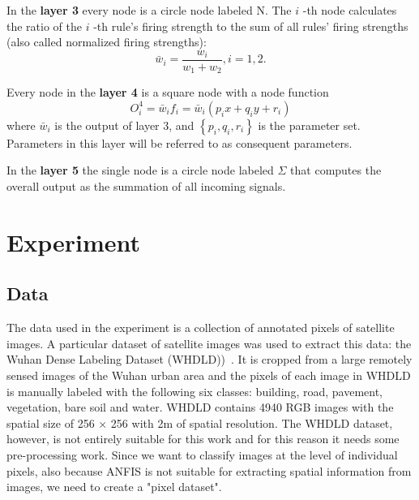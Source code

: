 \documentclass[10pt,twocolumn,letterpaper]{article}
\begin{document}
In the \textbf{layer 3} every node is a circle node labeled $\mathrm{N}$. The $i$ -th node calculates the ratio of the $i$ -th rule's firing strength to the sum of all rules' firing strengths (also called normalized firing strengths):
$$
\bar{w}_{i}=\frac{w_{i}}{w_{1}+w_{2}}, i=1,2 .
$$

Every node in the \textbf{layer 4} is a square node with a node function
$$
O_{i}^{4}=\bar{w}_{i} f_{i}=\bar{w}_{i}\left(p_{i} x+q_{i} y+r_{i}\right)
$$
where $\bar{w}_{i}$ is the output of layer 3, and $\left\{p_{i}, q_{i}, r_{i}\right\}$ is the parameter set. Parameters in this layer will be referred to as consequent parameters.

In the \textbf{layer 5} the single node is a circle node labeled $\Sigma$ that computes the overall output as the summation of all incoming signals.

\section{Experiment}


\subsection{Data}

The data used in the experiment is a collection of annotated pixels of satellite images.
A particular dataset of satellite images was used to extract this data: the Wuhan Dense Labeling Dataset (WHDLD))~\cite{WHDLD}. It is cropped from a large remotely sensed images of the Wuhan urban area and the pixels of each image in WHDLD is manually labeled with the following six classes: building, road, pavement, vegetation, bare soil and water. WHDLD contains 4940 RGB images with the spatial size of 256 × 256 with 2m of spatial resolution. 
The WHDLD dataset, however, is not entirely suitable for this work and for this reason it needs some pre-processing work. Since we want to classify images at the level of individual pixels, also because ANFIS is not suitable for extracting spatial information from images, we need to create a "pixel dataset".
\end{document}
